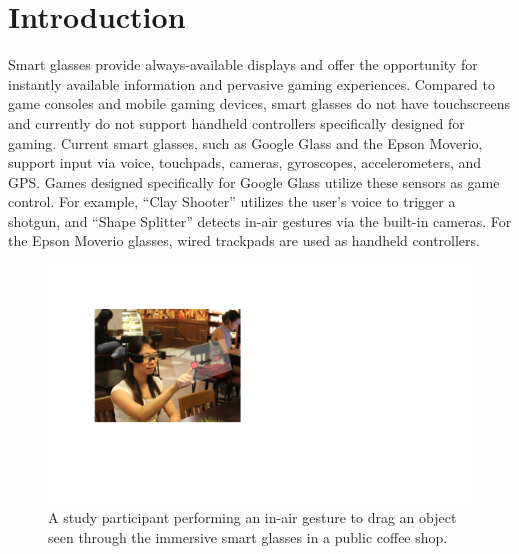 \documentclass{sigchi}
\begin{document}
\section{Introduction}

Smart glasses provide always-available displays and offer the opportunity for instantly available information and pervasive gaming experiences. 
Compared to game consoles and mobile gaming devices, smart glasses do not have touchscreens and currently do not support handheld controllers specifically designed for gaming.
Current smart glasses, such as Google Glass and the Epson Moverio, support input via voice, touchpads, cameras, gyroscopes, accelerometers, and GPS.
Games designed specifically for Google Glass \cite{MiniGames} utilize these sensors as game control. 
For example, ``Clay Shooter'' utilizes the user's voice to trigger a shotgun, and ``Shape Splitter'' detects in-air gestures via the built-in cameras. 
For the Epson Moverio glasses, wired trackpads are used as handheld controllers.


 \begin{figure}[!t]
  \centering
  \includegraphics[width=0.8\columnwidth]{TopFigure2.pdf}
  \caption{A study participant performing an in-air gesture to drag an object seen through the immersive smart glasses in a public coffee shop.}
  \label{fig:TopFigure}
  \end{figure} 
\end{document}
